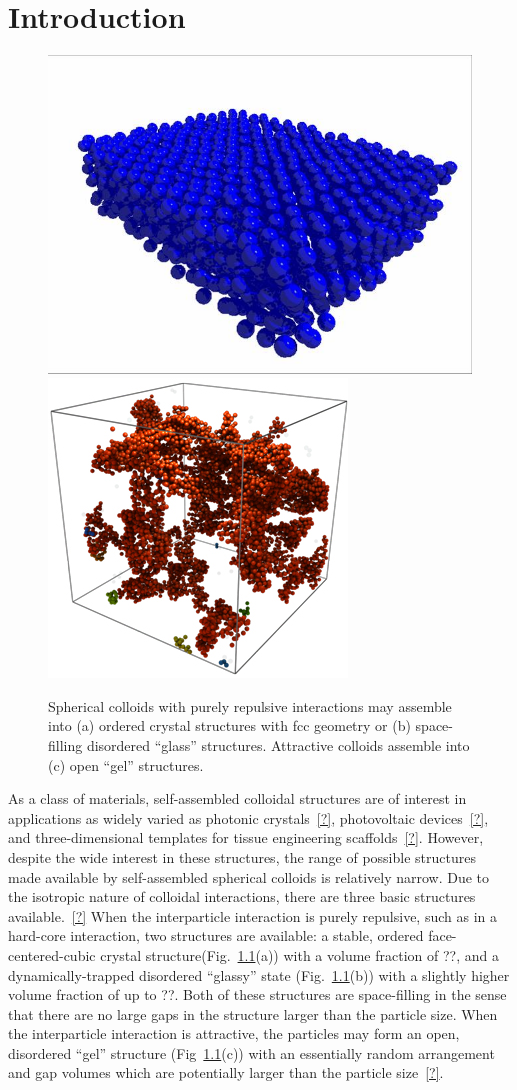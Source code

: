\chapter{Introduction}

\begin{figure}

\includegraphics[width=0.45\linewidth]{figures/literature-review/sphere-crystal.png}\includegraphics[width=0.45\linewidth]{figures/literature-review/sphere-gel.png}
\caption{Spherical colloids with purely repulsive interactions may assemble into (a) ordered 
crystal structures with fcc geometry or (b) space-filling disordered ``glass'' structures. Attractive
colloids assemble into (c) open ``gel'' structures.}

\label{fig:isotropic-structs}

\end{figure}

As a class of materials, self-assembled colloidal structures are of interest in applications as widely varied
as photonic crystals~\ref{?}, photovoltaic devices~\ref{?}, and three-dimensional templates for tissue 
engineering scaffolds~\ref{?}. However, despite the wide interest in these structures, the range of possible 
structures made available by self-assembled spherical colloids is relatively narrow.  Due to the isotropic nature
of colloidal interactions, there are three basic structures available.~\ref{?}  When the interparticle interaction is purely 
repulsive, such as in a hard-core interaction, two structures are available: a stable, ordered face-centered-cubic crystal
structure(Fig.~\ref{fig:isotropic-structs}(a)) with a volume fraction of ??, and a dynamically-trapped disordered ``glassy''
state (Fig.~\ref{fig:isotropic-structs}(b)) with a slightly higher volume fraction of up to ??.  Both of these 
structures are space-filling in the sense that there are no large gaps in the structure larger than the 
particle size.  When the interparticle interaction is attractive, the particles may form an open, disordered ``gel'' 
structure (Fig~\ref{fig:isotropic-structs}(c)) 
with an essentially random arrangement and gap volumes which are potentially larger than the particle size~\ref{?}.

